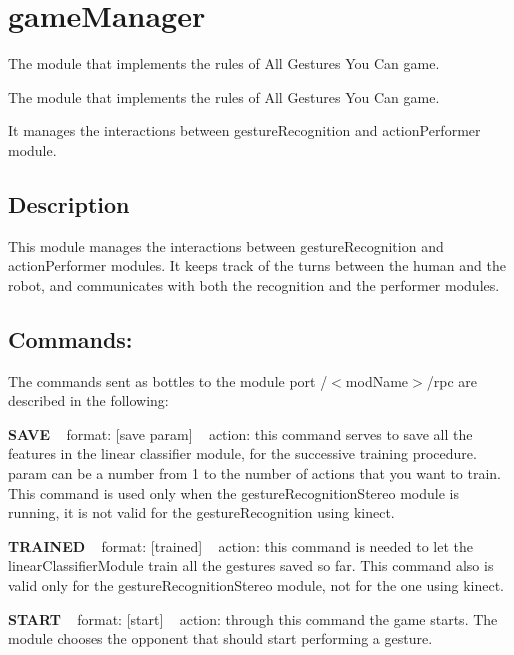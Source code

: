 \section{game\+Manager}
\label{group__gameManager}


The module that implements the rules of All Gestures You Can game.  


The module that implements the rules of All Gestures You Can game. 

It manages the interactions between gesture\+Recognition and action\+Performer module.\hypertarget{group__gestureRecognitionStereo_intro_sec}{}\subsection{Description}\label{group__gestureRecognitionStereo_intro_sec}
This module manages the interactions between gesture\+Recognition and action\+Performer modules. It keeps track of the turns between the human and the robot, and communicates with both the recognition and the performer modules.\hypertarget{group__gestureRecognitionStereo_rpc_port}{}\subsection{Commands\+:}\label{group__gestureRecognitionStereo_rpc_port}
The commands sent as bottles to the module port /$<$mod\+Name$>$/rpc are described in the following\+:

{\bfseries S\+A\+VE} ~\newline
format\+: \mbox{[}save param\mbox{]} ~\newline
action\+: this command serves to save all the features in the linear classifier module, for the successive training procedure. param can be a number from 1 to the number of actions that you want to train. This command is used only when the gesture\+Recognition\+Stereo module is running, it is not valid for the gesture\+Recognition using kinect.

{\bfseries T\+R\+A\+I\+N\+ED} ~\newline
format\+: \mbox{[}trained\mbox{]} ~\newline
action\+: this command is needed to let the linear\+Classifier\+Module train all the gestures saved so far. This command also is valid only for the gesture\+Recognition\+Stereo module, not for the one using kinect.

{\bfseries S\+T\+A\+RT} ~\newline
format\+: \mbox{[}start\mbox{]} ~\newline
action\+: through this command the game starts. The module chooses the opponent that should start performing a gesture.

